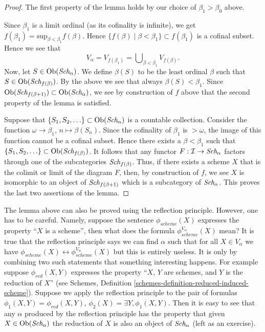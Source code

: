 \begin{proof}
\medskip\noindent
The first property of the lemma holds by our choice
of $\beta_1 > \beta_0$ above.

\medskip\noindent
Since $\beta_1$ is a limit ordinal (as its cofinality is infinite),
we get $f(\beta_1) = \text{sup}_{\beta < \beta_1} f(\beta)$.
Hence $\{f(\beta) \mid \beta < \beta_1\} \subset f(\beta_1)$ is a
cofinal subset. Hence we see that
$$
V_\alpha = V_{f(\beta_1)} = \bigcup\nolimits_{\beta < \beta_1} V_{f(\beta)}.
$$
Now, let $S \in \mathop{\rm Ob}\nolimits(\textit{Sch}_\alpha)$. We define
$\beta(S)$ to be the least ordinal $\beta$ such that
$S \in \mathop{\rm Ob}\nolimits(\textit{Sch}_{f(\beta)})$. By the above we see
that always $\beta(S) < \beta_1$. Since
$\mathop{\rm Ob}\nolimits(\textit{Sch}_{f(\beta + 1)}) \subset
\mathop{\rm Ob}\nolimits(\textit{Sch}_\alpha)$, we
see by construction of $f$ above that the second property of the lemma
is satisfied.

\medskip\noindent
Suppose that $\{S_1, S_2, \ldots\} \subset \mathop{\rm Ob}\nolimits(\textit{Sch}_\alpha)$
is a countable collection. Consider the function
$\omega \to \beta_1$, $n \mapsto \beta(S_n)$. Since the cofinality
of $\beta_1$ is $> \omega$, the image of this function cannot be a
cofinal subset. Hence there exists a $\beta < \beta_1$ such
that $\{S_1, S_2, \ldots\} \subset \mathop{\rm Ob}\nolimits(\textit{Sch}_{f(\beta)})$.
It follows that any functor $F : \mathcal{I} \to \textit{Sch}_\alpha$
factors through one of the subcategories $\textit{Sch}_{f(\beta)}$.
Thus, if there exists a scheme $X$ that is the colimit or limit
of the diagram $F$, then, by construction of $f$, we see
$X$ is isomorphic to an object
of $\textit{Sch}_{f(\beta + 1)}$ which is a subcategory of
$\textit{Sch}_\alpha$. This proves the last two assertions of
the lemma.
\end{proof}

\begin{remark}
\label{remark-how-to-use-reflection}
The lemma above can also be proved using the reflection principle.
However, one has to be careful. Namely, suppose the sentence
$\phi_{scheme}(X)$ expresses the property ``$X$ is a scheme'', then
what does the formula $\phi_{scheme}^{V_\alpha}(X)$ mean?
It is true that the reflection principle says we can find $\alpha$ such that
for all $X \in V_\alpha$ we have
$\phi_{scheme}(X) \leftrightarrow \phi_{scheme}^{V_\alpha}(X)$
but this is entirely useless. It is only by combining two such
statements that something interesting happens. For example suppose
$\phi_{red}(X, Y)$ expresses the property ``$X$, $Y$ are schemes,
and $Y$ is the reduction of $X$'' (see
Schemes, Definition \ref{schemes-definition-reduced-induced-scheme}).
Suppose we apply the reflection principle to the pair of
formulas $\phi_1(X, Y) = \phi_{red}(X, Y)$,
$\phi_2(X) = \exists Y, \phi_1(X, Y)$. Then it is easy to see that
any $\alpha$ produced by the reflection principle has the property that
given $X \in \mathop{\rm Ob}\nolimits(\textit{Sch}_\alpha)$ the reduction of
$X$ is also an object of $\textit{Sch}_\alpha$ (left as an exercise).
\end{remark}

